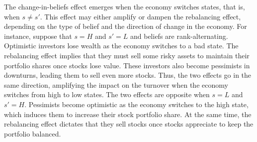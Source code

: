 The change-in-beliefs effect emerges when the economy switches states, that is, when $s \neq s'$. This effect may either amplify or dampen the rebalancing effect, depending on the type of belief and the direction of change in the economy. For instance, suppose that $s = H$ and $s' = L$ and beliefs are rank-alternating. Optimistic investors lose wealth as the economy switches to a bad state. The rebalancing effect implies that they must sell some risky assets to maintain their portfolio shares once stocks lose value. These investors also become pessimists in downturns, leading them to sell even more stocks. Thus, the two effects go in the same direction, amplifying the impact on the turnover when the economy switches from high to low states. The two effects are opposite when $s = L$ and $s' = H$. Pessimists become optimistic as the economy switches to the high state, which induces them to increase their stock portfolio share. At the same time, the rebalancing effect dictates that they sell stocks once stocks appreciate to keep the portfolio balanced.


